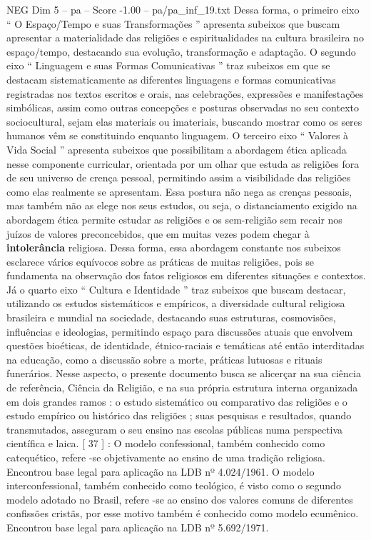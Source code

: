 \begin{textsample}{NEG Dim 5 – pa – Score -1.00 – pa/pa\_inf\_19.txt}
Dessa forma, o primeiro eixo “ O Espaço/Tempo e suas Transformações ” apresenta subeixos que buscam apresentar a materialidade das religiões e espiritualidades na cultura brasileira no espaço/tempo, destacando sua evolução, transformação e adaptação.
O segundo eixo “ Linguagem e suas Formas Comunicativas ” traz subeixos em que se destacam sistematicamente as diferentes linguagens e formas comunicativas registradas nos textos escritos e orais, nas celebrações, expressões e manifestações simbólicas, assim como outras concepções e posturas observadas no seu contexto sociocultural, sejam elas materiais ou imateriais, buscando mostrar como os seres humanos vêm se constituindo enquanto linguagem.
O terceiro eixo “ Valores à Vida Social ” apresenta subeixos que possibilitam a abordagem ética aplicada nesse componente curricular, orientada por um olhar que estuda as religiões fora de seu universo de crença pessoal, permitindo assim a visibilidade das religiões como elas realmente se apresentam.
Essa postura não nega as crenças pessoais, mas também não as elege nos seus estudos, ou seja, o distanciamento exigido na abordagem ética permite estudar as religiões e os sem-religião sem recair nos juízos de valores preconcebidos, que em muitas vezes podem chegar à \textbf{intolerância} religiosa.
Dessa forma, essa abordagem constante nos subeixos esclarece vários equívocos sobre as práticas de muitas religiões, pois se fundamenta na observação dos fatos religiosos em diferentes situações e contextos.
Já o quarto eixo “ Cultura e Identidade ” traz subeixos que buscam destacar, utilizando os estudos sistemáticos e empíricos, a diversidade cultural religiosa brasileira e mundial na sociedade, destacando suas estruturas, cosmovisões, influências e ideologias, permitindo espaço para discussões atuais que envolvem questões bioéticas, de identidade, étnico-raciais e temáticas até então interditadas na educação, como a discussão sobre a morte, práticas lutuosas e rituais funerários.
Nesse aspecto, o presente documento busca se alicerçar na sua ciência de referência, Ciência da Religião, e na sua própria estrutura interna organizada em dois grandes ramos : o estudo sistemático ou comparativo das religiões e o estudo empírico ou histórico das religiões ; suas pesquisas e resultados, quando transmutados, asseguram o seu ensino nas escolas públicas numa perspectiva científica e laica. [ 37 ] : O modelo confessional, também conhecido como catequético, refere -se objetivamente ao ensino de uma tradição religiosa.
Encontrou base legal para aplicação na LDB nº 4.024/1961.
O modelo interconfessional, também conhecido como teológico, é visto como o segundo modelo adotado no Brasil, refere -se ao ensino dos valores comuns de diferentes confissões cristãs, por esse motivo também é conhecido como modelo ecumênico.
Encontrou base legal para aplicação na LDB nº 5.692/1971.

\end{textsample}
